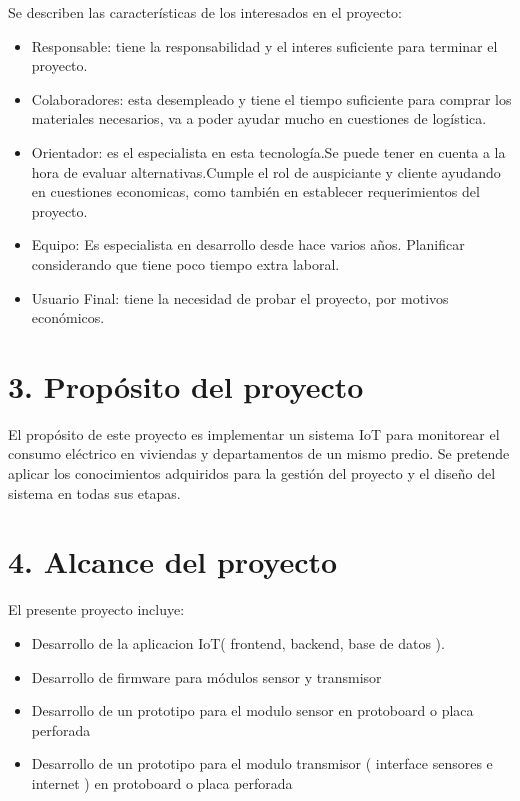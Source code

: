 \documentclass[
11pt, %
]{charter}
\begin{document}
Se describen las características de los interesados en el proyecto:

\begin{itemize}
	\item Responsable: tiene la responsabilidad y el interes suficiente para terminar el proyecto.
	\item Colaboradores: esta desempleado y tiene el tiempo suficiente para comprar los materiales necesarios, va a poder ayudar mucho en cuestiones de logística.
	\item Orientador: es el especialista en esta tecnología.Se puede tener en cuenta  a la hora de evaluar alternativas.Cumple el rol de auspiciante y cliente ayudando en cuestiones economicas, como también en establecer requerimientos del proyecto.
	\item Equipo: Es especialista en desarrollo desde hace varios años. Planificar considerando que tiene poco tiempo extra laboral.
	\item Usuario Final: tiene la necesidad de probar el proyecto, por motivos económicos.
\end{itemize}




\section{3. Propósito del proyecto}
\label{sec:proposito}


El propósito de este proyecto es implementar un sistema IoT para monitorear el consumo eléctrico en viviendas y departamentos de un mismo predio.
Se pretende aplicar los conocimientos adquiridos para la gestión del proyecto y el diseño del sistema en todas sus etapas.


\section{4. Alcance del proyecto}
\label{sec:alcance}


El presente proyecto incluye:

\begin{itemize}
\item{Desarrollo de la aplicacion IoT( frontend, backend, base de datos ).}
\item{Desarrollo de firmware para módulos sensor y transmisor }
\item{Desarrollo de un prototipo  para el modulo sensor en protoboard o placa perforada}
\item{Desarrollo de un prototipo para el modulo transmisor ( interface sensores e internet ) en protoboard o placa perforada}
\end{itemize}
\end{document}
